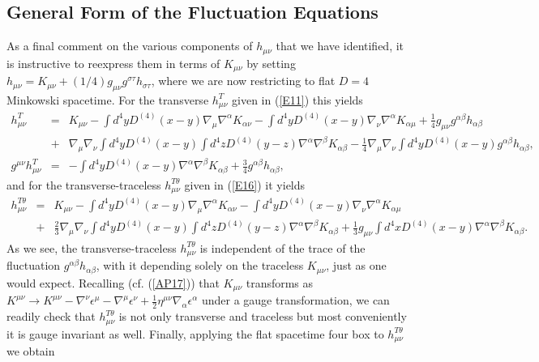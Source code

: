 \documentclass[aps]{revtex4}
\begin{document}
\subsection{General Form of the Fluctuation Equations}

As a final comment on the various components of $h_{\mu\nu}$ that we have identified, it is instructive to reexpress them in terms of $K_{\mu\nu}$ by setting  $h_{\mu\nu}=K_{\mu\nu}+(1/4)g_{\mu\nu}g^{\sigma\tau}h_{\sigma\tau}$, where we are now restricting to flat $D=4$ Minkowski spacetime. For the transverse $h_{\mu\nu}^T$ given in (\ref{E11}) this yields 
%
\begin{eqnarray}
h_{\mu\nu}^T&=&K_{\mu\nu}-\int d^4y D^{(4)}(x-y)\nabla_{\mu}\nabla^{\alpha}K_{\alpha\nu}
-\int d^4y D^{(4)}(x-y)\nabla_{\nu}\nabla^{\alpha}K_{\alpha\mu}+\frac{1}{4}g_{\mu\nu}g^{\alpha\beta}h_{\alpha\beta}
\nonumber\\
&+&\nabla_{\mu}\nabla_{\nu}\int d^4y D^{(4)}(x-y)\int d^4z D^{(4)}(y-z)\nabla^{\alpha}\nabla^{\beta}K_{\alpha\beta}
-\frac{1}{4}\nabla_{\mu}\nabla_{\nu}\int d^4y D^{(4)}(x-y)g^{\alpha\beta}h_{\alpha\beta},
\nonumber\\
g^{\mu\nu}h^T_{\mu\nu}&=&-\int d^4y D^{(4)}(x-y)\nabla^{\alpha}\nabla^{\beta}K_{\alpha\beta}+\frac{3}{4}g^{\alpha\beta}h_{\alpha\beta},
\label{E35}
\end{eqnarray}
%
and for the transverse-traceless $h_{\mu\nu}^{T\theta}$ given in (\ref{E16}) it yields 
%
\begin{eqnarray}
h_{\mu\nu}^{T\theta}&=&K_{\mu\nu}-\int d^4y D^{(4)}(x-y)\nabla_{\mu}\nabla^{\alpha}K_{\alpha\nu}
-\int d^4y D^{(4)}(x-y)\nabla_{\nu}\nabla^{\alpha}K_{\alpha\mu}
\nonumber\\
&+&\frac{2}{3}\nabla_{\mu}\nabla_{\nu}\int d^4y D^{(4)}(x-y)\int d^4z D^{(4)}(y-z)\nabla^{\alpha}\nabla^{\beta}K_{\alpha\beta}+\frac{1}{3}g_{\mu\nu}\int d^4x D^{(4)}(x-y)\nabla^{\alpha}\nabla^{\beta}K_{\alpha\beta}.
\label{E36}
\end{eqnarray}
%
As we see, the transverse-traceless $h_{\mu\nu}^{T\theta}$ is independent of the trace of the fluctuation $g^{\alpha\beta}h_{\alpha\beta}$, with it depending solely on the traceless $K_{\mu\nu}$,  just as one would expect. Recalling (cf. (\ref{AP17})) that $K_{\mu\nu}$ transforms as $K^{\mu\nu}\rightarrow K^{\mu\nu}-\nabla^{\nu}\epsilon^{\mu}-\nabla^{\mu}\epsilon^{\nu}+\frac{1}{2}\eta^{\mu\nu}\nabla_{\alpha}\epsilon^{\alpha}$ under a gauge transformation, we can readily check that $h_{\mu\nu}^{T\theta}$ is not only transverse and traceless but  most conveniently it is gauge invariant as well. Finally, applying the flat spacetime four box to $h_{\mu\nu}^{T\theta}$ we obtain
\end{document}

